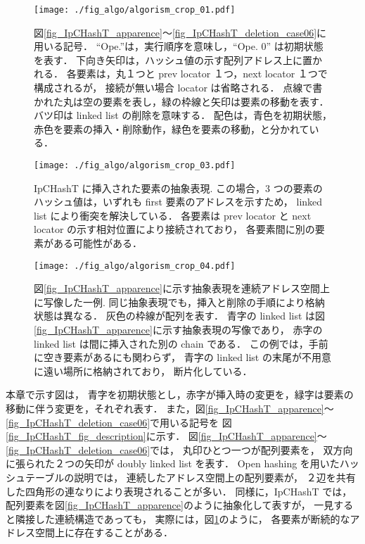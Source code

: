 \begin{figure}
  \texttt{[image: ./fig\_algo/algorism\_crop\_01.pdf]}
  \caption{
    図\ref{fig_IpCHashT_apparence}〜\ref{fig_IpCHashT_deletion_case06}に用いる記号．
    ``Ope.''は，実行順序を意味し，``Ope. 0'' は初期状態を表す．
    下向き矢印は，ハッシュ値の示す配列アドレス上に置かれる．
    各要素は，丸１つと prev locator １つ，next locator １つで構成されるが，
    接続が無い場合 locator は省略される．
    点線で書かれた丸は空の要素を表し，緑の枠線と矢印は要素の移動を表す．
    バツ印は linked list の削除を意味する．
    配色は，青色を初期状態，赤色を要素の挿入・削除動作，緑色を要素の移動，と分かれている．
  }
  \label{fig_IpCHashT_fig_description}

  \texttt{[image: ./fig\_algo/algorism\_crop\_03.pdf]}
  \caption{
    IpCHashT に挿入された要素の抽象表現.
    この場合，3 つの要素のハッシュ値は，いずれも first 要素のアドレスを示すため，
    linked list により衝突を解決している．
    各要素は prev locator と next locator の示す相対位置により接続されており，
    各要素間に別の要素がある可能性がある．
  }
  \label{fig_IpCHashT_apparence}

  \texttt{[image: ./fig\_algo/algorism\_crop\_04.pdf]}
  \caption{
    図\ref{fig_IpCHashT_apparence}に示す抽象表現を連続アドレス空間上に写像した一例.
    同じ抽象表現でも，挿入と削除の手順により格納状態は異なる．
    灰色の枠線が配列を表す．
    青字の linked list は図\ref{fig_IpCHashT_apparence}に示す抽象表現の写像であり，
    赤字の linked list は間に挿入された別の chain である．
    この例では，手前に空き要素があるにも関わらず，
    青字の linked list の末尾が不用意に遠い場所に格納されており，
    断片化している．
  }
  \label{fig_IpCHashT_insert_introspection}
\end{figure}

本章で示す図は，
青字を初期状態とし，赤字が挿入時の変更を，緑字は要素の移動に伴う変更を，それぞれ表す．
また，図\ref{fig_IpCHashT_apparence}〜\ref{fig_IpCHashT_deletion_case06}で用いる記号を
図\ref{fig_IpCHashT_fig_description}に示す．
図\ref{fig_IpCHashT_apparence}〜\ref{fig_IpCHashT_deletion_case06}では，
丸印ひとつ一つが配列要素を，
双方向に張られた２つの矢印が doubly linked list を表す．
Open hashing を用いたハッシュテーブルの説明では，
連続したアドレス空間上の配列要素が，
２辺を共有した四角形の連なりにより表現されることが多い．
同様に，IpCHashT では，配列要素を図\ref{fig_IpCHashT_apparence}のように抽象化して表すが，
一見すると隣接した連続構造であっても，
実際には，図\ref{fig_IpCHashT_insert_introspection}のように，
各要素が断続的なアドレス空間上に存在することがある．

